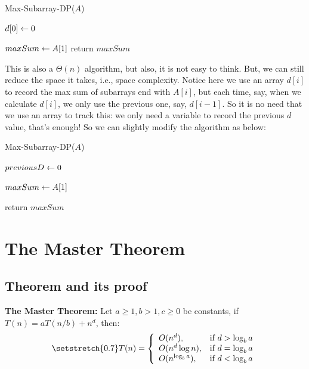 \documentclass[11pt, a4paper]{COMP3711}
\begin{document}
\begin{spacing}{1.5}
    \begin{algorithm}
        \caption{Max-Subarray-DP($A$)}
        $d[0]\leftarrow 0$ \qquad {}

        $maxSum\leftarrow A[1]$\qquad {}
        return $maxSum$
    \end{algorithm}

    This is also a $\Theta(n)$ algorithm, but also, it is not easy 
    to think. But, we can still reduce the space it takes, i.e., 
    space complexity. Notice here we use an array $d[i]$ to record 
    the max sum of subarrays end with $A[i]$, but each time, 
    say, when we calculate $d[i]$, we only use the previous one,
    say, $d[i-1]$. So it is no need that we use an array to track this:
    we only need a variable to record the previous $d$ value,
    that's enough! So we can slightly modify the algorithm as below:

    \begin{algorithm}
        \caption{Max-Subarray-DP($A$)}
        $previousD\leftarrow 0$ 

        $maxSum\leftarrow A[1]$

        return $maxSum$
    \end{algorithm}

    \section{The Master Theorem}

    \subsection{Theorem and its proof}

    {\bf The Master Theorem:} Let $a\ge 1, b>1, c\ge 0$
    be constants, if $T(n)=aT(n/b)+n^d$, then:
    \begin{align*}
        \setstretch{0.7}
        T(n)=\left\{ \begin{array}{ll}
            O(n^d), & \text{if } d>\log_b{a}\\
            O(n^d\log n), & \text{if } d = \log_b{a}\\
            O(n^{\log_b{a}}), & \text{if } d < \log_b{a}\\
        \end{array}\right.
    \end{align*}


\end{spacing}
\end{document}
